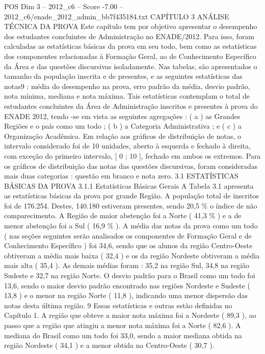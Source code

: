 \begin{textsample}{POS Dim 3 – 2012\_c6 – Score -7.00 – 2012\_c6/enade\_2012\_admin\_bb7f435184.txt}  \label{ex:f3_pos_265}
CAPÍTULO 3 ANÁLISE TÉCNICA DA PROVA Este capítulo tem por objetivo apresentar o desempenho dos estudantes concluintes de Administração no ENADE/2012.
Para isso, foram calculadas as estatísticas básicas da prova em seu todo, bem como as estatísticas dos componentes relacionadas à Formação Geral, ao de Conhecimento Específico da Área e das questões discursivas isoladamente.
Nas tabelas, são apresentados o tamanho da população inscrita e de presentes, e as seguintes estatísticas das notas9 : média do desempenho na prova, erro padrão da média, desvio padrão, nota mínima, mediana e nota máxima.
Tais estatísticas contemplam o total de estudantes concluintes da Área de Administração inscritos e presentes à prova do ENADE 2012, tendo -se em vista as seguintes agregações : ( a ) as Grandes Regiões e o país como um todo ; ( b ) a Categoria Administrativa ; e ( c ) a Organização Acadêmica.
Em relação aos gráficos de distribuição de notas, o intervalo considerado foi de 10 unidades, aberto à esquerda e fechado à direita, com exceção do primeiro intervalo, [ 0 ; 10 ], fechado em ambos os extremos.
Para os gráficos de distribuição das notas das questões discursivas, foram consideradas mais duas categorias : questão em branco e nota zero. 3.1 ESTATÍSTICAS BÁSICAS DA PROVA 3.1.1 Estatísticas Básicas Gerais A Tabela 3.1 apresenta as estatísticas básicas da prova por grande Região.
A população total de inscritos foi de 176.254.
Destes, 140.180 estiveram presentes, sendo 20,5 \% o índice de não comparecimento.
A Região de maior abstenção foi a Norte ( 41,3 \% ) e a de menor abstenção foi a Sul ( 16,9 \% ).
A média das notas da prova como um todo ( nas seções seguintes serão analisados os componentes de Formação Geral e de Conhecimento Específico ) foi 34,6, sendo que os alunos da região Centro-Oeste obtiveram a média mais baixa ( 32,4 ) e os da região Nordeste obtiveram a média mais alta ( 35,4 ).
As demais médias foram : 35,2 na região Sul, 34,8 na região Sudeste e 32,7 na região Norte.
O desvio padrão para o Brasil como um todo foi 13,6, sendo o maior desvio padrão encontrado nas regiões Nordeste e Sudeste ( 13,8 ) e o menor na região Norte ( 11,8 ), indicando uma menor dispersão das notas desta última região. 9 Essas estatísticas e outras estão definidas no Capítulo 1.
A região que obteve a maior nota máxima foi a Nordeste ( 89,3 ), ao passo que a região que atingiu a menor nota máxima foi a Norte ( 82,6 ).
A mediana do Brasil como um todo foi 33,0, sendo a maior mediana obtida na região Nordeste ( 34,1 ) e a menor obtida na Centro-Oeste ( 30,7 ).

\end{textsample}
